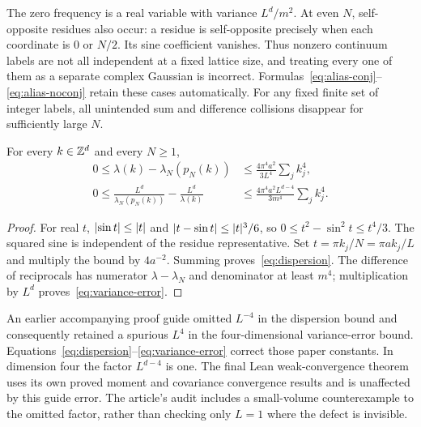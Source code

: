 The zero frequency is a real variable with variance $L^d/m^2$.
At even $N$, self-opposite residues also occur: a residue is self-opposite
precisely when each coordinate is $0$ or $N/2$. Its sine coefficient vanishes.
Thus nonzero continuum labels are not all independent at a fixed lattice
size, and treating every one of them as a separate complex Gaussian is
incorrect. Formulas~\eqref{eq:alias-conj}--\eqref{eq:alias-noconj} retain these
cases automatically. For any fixed finite set of integer labels, all
unintended sum and difference collisions disappear for sufficiently large $N$.

\begin{lemma}\label{lem:dispersion}
For every $k\in\mathbb Z^d$ and every $N\geq1$,
\begin{align}
0\leq\lambda(k)-\lambda_N(p_N(k))
 &\leq \frac{4\pi^4a^2}{3L^4}\sum_jk_j^4,\label{eq:dispersion}\\
0\leq\frac{L^d}{\lambda_N(p_N(k))}-\frac{L^d}{\lambda(k)}
 &\leq\frac{4\pi^4a^2L^{d-4}}{3m^4}\sum_jk_j^4.\label{eq:variance-error}
\end{align}
\end{lemma}
\begin{proof}
For real $t$, $\lvert\sin t\rvert\leq\lvert t\rvert$ and
$\lvert t-\sin t\rvert\leq\lvert t\rvert^3/6$, so
$0\leq t^2-\sin^2t\leq t^4/3$.
The squared sine is independent of the residue representative. Set
$t=\pi k_j/N=\pi ak_j/L$ and multiply the bound by $4a^{-2}$.
Summing proves~\eqref{eq:dispersion}. The difference of reciprocals has
numerator $\lambda-\lambda_N$ and denominator at least $m^4$; multiplication
by $L^d$ proves~\eqref{eq:variance-error}.
\end{proof}
\begin{remark}\label{rem:correction}
An earlier accompanying proof guide omitted $L^{-4}$ in the dispersion
bound and consequently retained a spurious $L^4$ in the four-dimensional
variance-error bound. Equations~\eqref{eq:dispersion}--\eqref{eq:variance-error}
correct those paper constants. In dimension four the factor $L^{d-4}$ is one.
The final Lean weak-convergence theorem uses its own proved moment and
covariance convergence results and is unaffected by this guide error.
The article's audit includes a small-volume counterexample to the omitted
factor, rather than checking only $L=1$ where the defect is invisible.
\end{remark}
